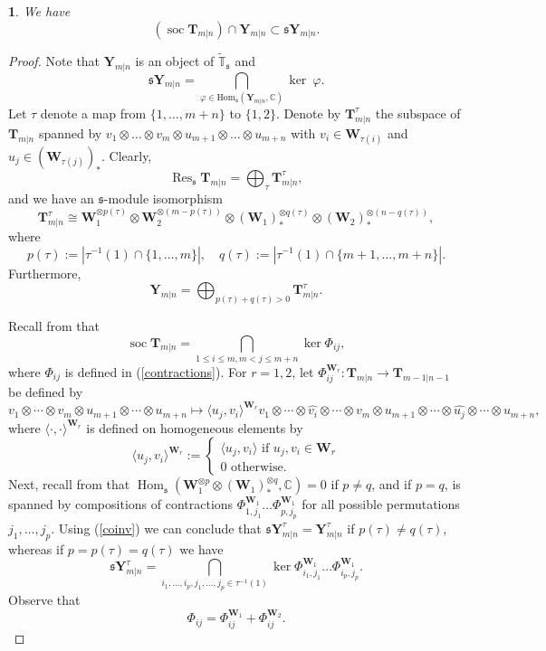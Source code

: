 \documentclass[12pt,oneside,english]{amsart}
\numberwithin{equation}{section}
\numberwithin{figure}{section}
\theoremstyle{plain}
\theoremstyle{plain}
\newtheorem{lem}[thm]{\protect\lemmaname}
\theoremstyle{remark}
\theoremstyle{definition}
\theoremstyle{plain}
\theoremstyle{remark}
\theoremstyle{definition}
\theoremstyle{plain}
\theoremstyle{plain}
\theoremstyle{definition}
\providecommand{\lemmaname}{Lemma}
\newcommand{\bT}{\mathbf{T}}
\newcommand{\bY}{\mathbf{Y}}
\newcommand{\bbW}{\mathbf{W}}
\newcommand{\soc}{\operatorname{soc}}
\newcommand{\Hom}{\operatorname{Hom}}
\newcommand{\fs}{\mathfrak{s}}
\newcommand{\Res}{\operatorname{Res}}
\begin{document}
\begin{lem}\label{lem:tech} We have
  $$(\soc \bT_{m|n})\cap \bY_{m|n}\subset\fs \bY_{m|n}.$$
\end{lem}
\begin{proof} Note that $\bY_{m|n}$ is an object of $\widetilde{\mathbb  T}_{\fs}$ and
\begin{equation}\label{coinv}
\fs\bY_{m|n}=\bigcap_{\varphi\in\mathrm{Hom}_{\fs}(\bY_{m|n},\mathbb{C})} \ker\ \varphi.
\end{equation}
Let $\tau$ denote a map from $\{1,\dots,m+n\}$ to $\{1,2\}$. Denote by
$\bT_{m|n}^{\tau}$ the subspace of $\bT_{m|n}$ spanned by
$v_1\otimes\dots\otimes v_m\otimes u_{m+1}\otimes\dots\otimes u_{m+n}$
with $v_i\in \bbW_{\tau(i)}$ and $u_j\in (\bbW_{\tau(j)})_*$. Clearly,
$$\Res_{\fs}\bT_{m|n}=\bigoplus_{\tau}\bT^{\tau}_{m|n},$$
and we have an $\fs$-module isomorphism
$$\bT_{m|n}^{\tau}\cong \bbW_1^{\otimes p(\tau)}\otimes \bbW_2^{\otimes  (m-p(\tau))}\otimes (\bbW_1)_*^{\otimes q(\tau)}\otimes (\bbW_2)_*^{\otimes (n-q(\tau))},$$
where
$$p(\tau):=|\tau^{-1}(1)\cap\{1,\dots,m\}|, \quad q(\tau):=|\tau^{-1}(1)\cap\{m+1,\dots,m+n\}|.$$
Furthermore,
$$\bY_{m|n}=\bigoplus_{p(\tau)+q(\tau)>0}\bT^{\tau}_{m|n}.$$

Recall from \cite[Theorem 2.1]{PStyr} that
$$\soc \bT_{m|n}=\bigcap_{1\leq i\leq m, m<j\leq m+n} \ker\Phi_{ij},$$
where $\Phi_{ij}$ is defined in (\ref{contractions}). For $r=1,2$,  let
$\Phi^{\bbW_r}_{ij}:\bT_{m|n}\to \bT_{m-1|n-1}$ be defined by
$$ v_1\otimes\cdots\otimes v_m\otimes u_{m+1}\otimes\cdots\otimes
u_{m+n} \mapsto \langle u_j , v_i \rangle^{\bbW_r}
v_1\otimes\cdots\otimes \widehat{v_i} \otimes\cdots\otimes v_m\otimes u_{m+1}\otimes\cdots\otimes \widehat{u_j} \otimes\cdots\otimes u_{m+n},
$$
where $ \langle \cdot , \cdot \rangle^{\bbW_r}$ is defined on homogeneous elements by
$$ \langle u_j , v_i \rangle^{\bbW_r}:=\begin{cases} \langle u_j, v_i \rangle\,\,\text{if}\,\, u_j,v_i\in \bbW_r\\
0 \,\,\text{otherwise.}\end{cases}$$
Next, recall from \cite{DPS} that $\Hom_{\fs}(\bbW_1^{\otimes p}\otimes(\bbW_1)_*^{\otimes  q},\mathbb C)=0$ if $p\neq q$, and
if $p=q$, is spanned by compositions of contractions
$\Phi^{\bbW_1}_{1,j_1}\dots \Phi^{\bbW_1}_{p,j_p}$ for all possible
permutations $j_1,\dots,j_p$. Using (\ref{coinv}) we can conclude that
$\fs \bY_{m|n}^{\tau}=\bY_{m|n}^{\tau}$ if $ p(\tau)\neq q(\tau)$, whereas if
  $p=p(\tau)=q(\tau)$ we have
  $$\fs\bY_{m|n}^{\tau}=\bigcap_{i_1,\dots,i_p,j_1,\dots,j_p\in\tau^{-1}(1)}\ker\Phi^{\bbW_1}_{i_1,j_1}\dots \Phi^{\bbW_1}_{i_p,j_p}.$$
  Observe that
\begin{equation}\label{sum}
  \Phi_{ij}=\Phi^{\bbW_1}_{ij}+\Phi^{\bbW_2}_{ij}.
  \end{equation}


\end{proof}
\end{document}
